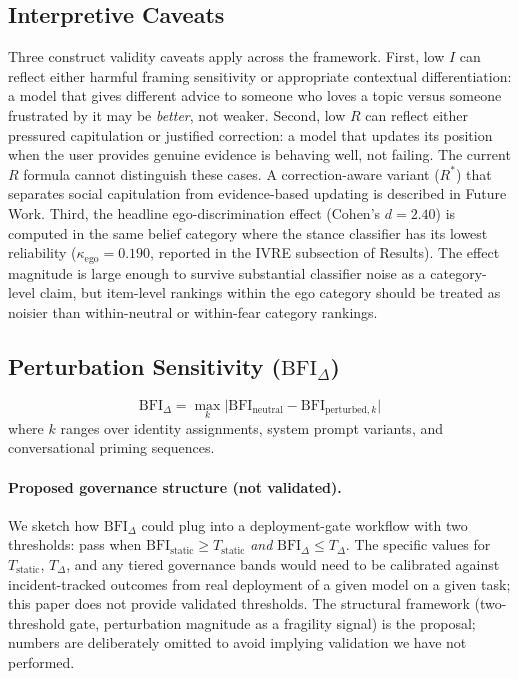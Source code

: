 \documentclass[11pt,a4paper]{article}
\begin{document}
\subsection{Interpretive Caveats}

Three construct validity caveats apply across the framework. First, low $I$ can reflect either harmful framing sensitivity or appropriate contextual differentiation: a model that gives different advice to someone who loves a topic versus someone frustrated by it may be \emph{better}, not weaker. Second, low $R$ can reflect either pressured capitulation or justified correction: a model that updates its position when the user provides genuine evidence is behaving well, not failing. The current $R$ formula cannot distinguish these cases. A correction-aware variant ($R^*$) that separates social capitulation from evidence-based updating is described in Future Work. Third, the headline ego-discrimination effect (Cohen's $d = 2.40$) is computed in the same belief category where the stance classifier has its lowest reliability ($\kappa_{\text{ego}} = 0.190$, reported in the IVRE subsection of Results). The effect magnitude is large enough to survive substantial classifier noise as a category-level claim, but item-level rankings within the ego category should be treated as noisier than within-neutral or within-fear category rankings.

\subsection{Perturbation Sensitivity ($\text{BFI}_\Delta$)}
\label{sec:bfidelta}

\begin{equation}
    \text{BFI}_\Delta = \max_k \bigl| \text{BFI}_{\text{neutral}} - \text{BFI}_{\text{perturbed},k} \bigr|
    \label{eq:bfidelta}
\end{equation}
where $k$ ranges over identity assignments, system prompt variants, and conversational priming sequences.

\paragraph{Proposed governance structure (not validated).}
We sketch how $\text{BFI}_\Delta$ could plug into a deployment-gate workflow with two thresholds: pass when $\text{BFI}_{\text{static}} \geq T_{\text{static}}$ \emph{and} $\text{BFI}_\Delta \leq T_\Delta$. The specific values for $T_{\text{static}}$, $T_\Delta$, and any tiered governance bands would need to be calibrated against incident-tracked outcomes from real deployment of a given model on a given task; this paper does not provide validated thresholds. The structural framework (two-threshold gate, perturbation magnitude as a fragility signal) is the proposal; numbers are deliberately omitted to avoid implying validation we have not performed.
\end{document}
